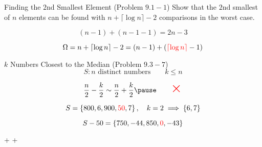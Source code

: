 
\begin{frame}{}
  \begin{exampleblock}{Finding the $2$nd Smallest Element (Problem $9.1-1$)}
    Show that the $2$nd smallest of $n$ elements can be found with $n + \lceil \log n \rceil - 2$
    comparisons in the worst case.
  \end{exampleblock}

  \pause
  \[
    (n-1) + (n-1-1) = 2n-3
  \]
\end{frame}

\begin{frame}{}
  \begin{adjustbox}{max totalsize={.7\textwidth}{.6\textheight},center}
    
  \end{adjustbox}



\end{frame}

\begin{frame}{}
  \centerline{}

  \pause
  \[
    \Omega = n + \lceil \log n \rceil - 2 = (n-1) + (\textcolor{red}{\lceil \log n \rceil} - 1)
  \]

  \pause
  \centerline{}
\end{frame}

\begin{frame}{}
  \begin{exampleblock}{$k$ Numbers Closest to the Median (Problem $9.3-7$)}
    \[
      S: n \text{ distinct numbers} \qquad k \le n
    \]
  \end{exampleblock}

  \pause
  \[
    \frac{n}{2} - \frac{k}{2} \sim \frac{n}{2} + \frac{k}{2} \pause \qquad \scalebox{2}{\red{$\times$}}
  \]

  \pause
  \[
    S = \left\{800, 6, 900, \textcolor{red}{50}, 7\right\}, \quad k = 2 \implies \left\{6,7\right\}
  \]

  \pause
  \[
    S - 50 = \left\{750, -44, 850, \textcolor{red}{0}, -43\right\}
  \]

  \pause
  \vspace{0.50cm}
  \centerline{ +  + }
\end{frame}
